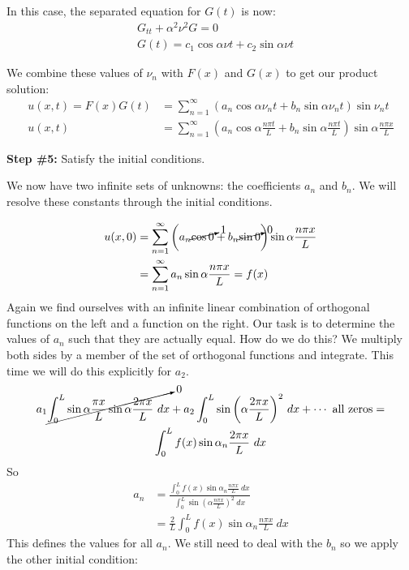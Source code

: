 \vspace{0.25cm}

\noindent In this case, the separated equation for $G(t)$ is now:
\begin{align*}
&G_{tt} + \alpha^2 \nu^2 G = 0 \\
&G(t) = c_1 \cos{\alpha \nu t} + c_2 \sin{\alpha \nu t}
\end{align*}



\noindent We combine these values of $\nu_n$ with $F(x)$ and $G(x)$ to get our product solution:
\begin{align*}
u(x,t) = F(x)G(t) &= \sum\limits_{n=1}^{\infty} \left(a_n \cos{\alpha \nu_n t} + b_n \sin{\alpha \nu_n t}\right)\sin{\nu_n t} \\
u(x,t) &= \sum\limits_{n=1}^{\infty} \left(a_n \cos{\alpha \frac{n \pi t}{L}} + b_n \sin{\alpha \frac{n \pi t}{L}} \right) \sin{\alpha \frac{n \pi x}{L}}
\end{align*}

\vspace{0.5cm}

\noindent\textbf{Step \#5:} Satisfy the initial conditions.

\vspace{0.25cm}

\noindent We now have two infinite sets of unknowns: the coefficients $a_n$ and $b_n$.  We will resolve these constants through the initial conditions.

\begin{align*}
u(x,0) &= \sum\limits_{n=1}^{\infty} \left(a_n \cancelto{1}{\cos{0}} + b_n \cancelto{0}{\sin{0}} \right)\sin{\alpha \frac{n \pi x}{L}} \\
&= \sum\limits_{n=1}^{\infty} a_n \sin{\alpha \frac{n \pi x}{L}} = f(x)
\end{align*}
Again we find ourselves with an infinite linear combination of orthogonal functions on the left and a function on the right.  Our task is to determine the values of $a_n$ such that they are actually equal.  How do we do this?  We multiply both sides by a member of the set of orthogonal functions and integrate.  This time we will do this explicitly for $a_2$.
\begin{multline*}
a_1 \cancelto{0}{\int_{0}^{L} \sin{\alpha \frac{\pi x}{L}} \sin{\alpha \frac{2 \pi x}{L}} \ dx} + a_2 \int_{0}^{L} \sin{\left(\alpha \frac{2 \pi x}{L}\right)}^2 \ dx + \cdots \text{ all zeros} = \\ \int_{0}^{L} f(x) \sin{\alpha_n \frac{2 \pi x}{L}} \ dx
\end{multline*}
So
\begin{align*}
a_n &= \frac{\int_{0}^{L} f(x) \sin{\alpha_n \frac{n \pi x}{L}} \ dx}{\int_0^L \sin{\left(\alpha \frac{n \pi x}{L} \right)}^2 \ dx} \\
&= \frac{2}{L} \int_{0}^{L} f(x) \sin{\alpha_n \frac{n \pi x}{L}} \ dx
\end{align*}
This defines the values for all $a_n$.  We still need to deal with the $b_n$ so we apply the other initial condition:

